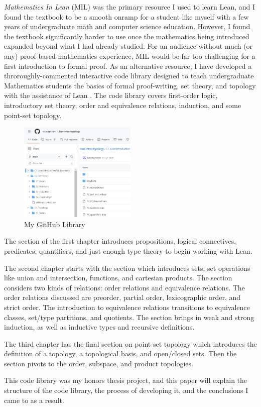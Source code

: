 \textit{Mathematics In Lean} (MIL) was the primary resource I used 
to learn Lean, and I found the textbook to be a smooth
onramp for a student like myself with a few years of undergraduate
math and computer science education. However, I found the textbook
significantly harder to use once the mathematics being introduced 
expanded beyond what I had already studied. For an audience without
much (or any) proof-based mathematics experience, MIL would be 
far too challenging for a first introduction to formal proof.
As an alternative resource, I have developed a throroughly-commented
interactive code library designed to teach undergraduate Mathematics
students the basics of formal proof-writing, set theory, and topology 
with the assistance of Lean \cite{GrenierLIT}. The code library covers first-order logic,
introductory set theory, order and equivalence relations, induction, and
some point-set topology. 

\begin{figure}
    \caption{My GitHub Library}
    \centering
    \includegraphics[width=0.5\textwidth]{Chapter1/repo.png}
\end{figure}

The section  of the first chapter  introduces propositions, 
logical connectives, predicates, quantifiers, and just enough
type theory to begin working with Lean. 

The second chapter  starts with the section
 which introduces sets, set operations like union and intersection,
functions, and cartesian products.
The section  considers two kinds of relations:
order relations and equivalence relations. The order relations
discussed are preorder, partial order, lexicographic order, and 
strict order. The introduction to equivalence relations transitions 
to equivalence classes, set/type partitions, and quotients. 
The section 
brings in weak and strong induction, as well as inductive
types and recursive definitions.

The third chapter  has the final section 
on point-set topology which introduces the definition of a 
topology, a topological basis, and open/closed sets. Then the section
pivots to the order, subspace, and product topologies.

This code library was my honors thesis project, and this paper
will explain the structure of the code library, the process of
developing it, and the conclusions I came to as a result.
